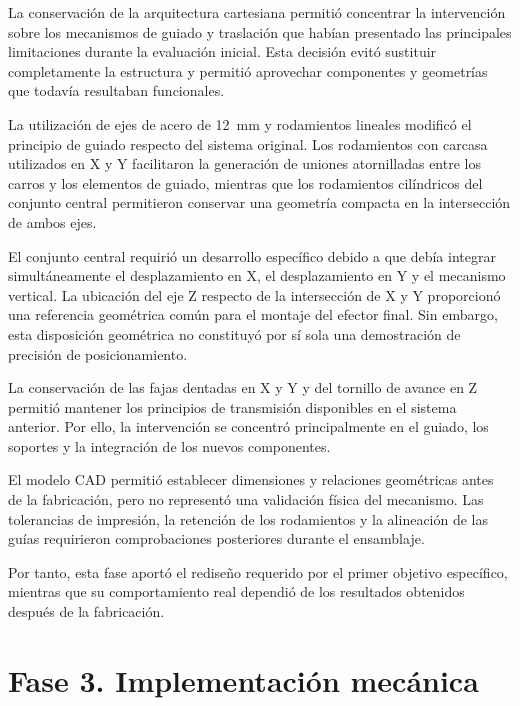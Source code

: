 La conservación de la arquitectura cartesiana permitió concentrar la intervención sobre los mecanismos de guiado y traslación que habían presentado las principales limitaciones durante la evaluación inicial. Esta decisión evitó sustituir completamente la estructura y permitió aprovechar componentes y geometrías que todavía resultaban funcionales.

La utilización de ejes de acero de 12~mm y rodamientos lineales modificó el principio de guiado respecto del sistema original. Los rodamientos con carcasa utilizados en X y Y facilitaron la generación de uniones atornilladas entre los carros y los elementos de guiado, mientras que los rodamientos cilíndricos del conjunto central permitieron conservar una geometría compacta en la intersección de ambos ejes.

El conjunto central requirió un desarrollo específico debido a que debía integrar simultáneamente el desplazamiento en X, el desplazamiento en Y y el mecanismo vertical. La ubicación del eje Z respecto de la intersección de X y Y proporcionó una referencia geométrica común para el montaje del efector final. Sin embargo, esta disposición geométrica no constituyó por sí sola una demostración de precisión de posicionamiento.

La conservación de las fajas dentadas en X y Y y del tornillo de avance en Z permitió mantener los principios de transmisión disponibles en el sistema anterior. Por ello, la intervención se concentró principalmente en el guiado, los soportes y la integración de los nuevos componentes.

El modelo CAD permitió establecer dimensiones y relaciones geométricas antes de la fabricación, pero no representó una validación física del mecanismo. Las tolerancias de impresión, la retención de los rodamientos y la alineación de las guías requirieron comprobaciones posteriores durante el ensamblaje.

Por tanto, esta fase aportó el rediseño requerido por el primer objetivo específico, mientras que su comportamiento real dependió de los resultados obtenidos después de la fabricación.



\section{Fase 3. Implementación mecánica}
\label{sec:discusion_fase3}

